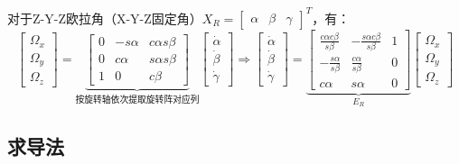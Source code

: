 \documentclass[
12pt, %
a4paper, 
oneside, %
headinclude,footinclude, %
]{scrartcl}
\begin{document}
\begin{itemize}
对于Z-Y-Z欧拉角（X-Y-Z固定角）$ X_R = \begin{bmatrix} \alpha & \beta & \gamma \end{bmatrix}^T $，有：
$$
\begin{bmatrix} \Omega_x \\ \Omega_y \\ \Omega_z \end{bmatrix}
= \underbrace{\begin{bmatrix} 0 & -s\alpha & c\alpha s\beta \\ 0 & c\alpha & s\alpha s\beta \\ 1 & 0 & c\beta \end{bmatrix}}_{\text{按旋转轴依次提取旋转阵对应列}} \begin{bmatrix} \dot{\alpha} \\ \dot{\beta} \\ \dot{\gamma} \end{bmatrix}
\Rightarrow \begin{bmatrix} \dot{\alpha} \\ \dot{\beta} \\ \dot{\gamma} \end{bmatrix}
= \underbrace{\begin{bmatrix} \frac{c\alpha c\beta}{s\beta} & -\frac{s\alpha c\beta}{s\beta} & 1 \\ -\frac{s\alpha}{s\beta} & \frac{c\alpha}{s\beta} & 0 \\ c\alpha & s\alpha & 0 \end{bmatrix}}_{E_R} \begin{bmatrix} \Omega_x \\ \Omega_y \\ \Omega_z \end{bmatrix}
$$
\end{itemize} 
\subsection[求导法]{求导法}
\end{document}
